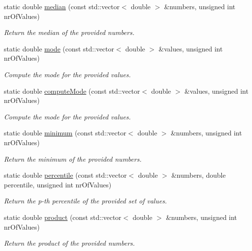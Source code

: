 \begin{DoxyCompactItemize}
static double \hyperlink{classmultiscale_1_1Numeric_a6aabc739f68b2c8f39d7aeab3935a340}{median} (const std\-::vector$<$ double $>$ \&numbers, unsigned int nr\-Of\-Values)
\begin{DoxyCompactList}\small\item\em Return the median of the provided numbers. \end{DoxyCompactList}\item 
static double \hyperlink{classmultiscale_1_1Numeric_abd90392bc165b82d9352e68cd4969373}{mode} (const std\-::vector$<$ double $>$ \&values, unsigned int nr\-Of\-Values)
\begin{DoxyCompactList}\small\item\em Compute the mode for the provided values. \end{DoxyCompactList}\item 
static double \hyperlink{classmultiscale_1_1Numeric_a8e8b37fd814847d7f15bdd9a7a6a7ae3}{compute\-Mode} (const std\-::vector$<$ double $>$ \&values, unsigned int nr\-Of\-Values)
\begin{DoxyCompactList}\small\item\em Compute the mode for the provided values. \end{DoxyCompactList}\item 
static double \hyperlink{classmultiscale_1_1Numeric_ac4c6e362613cb29641e1762b75489beb}{minimum} (const std\-::vector$<$ double $>$ \&numbers, unsigned int nr\-Of\-Values)
\begin{DoxyCompactList}\small\item\em Return the minimum of the provided numbers. \end{DoxyCompactList}\item 
static double \hyperlink{classmultiscale_1_1Numeric_a718a94c1f6ccfc038f2260a590e62ce4}{percentile} (const std\-::vector$<$ double $>$ \&numbers, double percentile, unsigned int nr\-Of\-Values)
\begin{DoxyCompactList}\small\item\em Return the p-\/th percentile of the provided set of values. \end{DoxyCompactList}\item 
static double \hyperlink{classmultiscale_1_1Numeric_a8e24dd3dea31a0180d7c01d6c019aba4}{product} (const std\-::vector$<$ double $>$ \&numbers, unsigned int nr\-Of\-Values)
\begin{DoxyCompactList}\small\item\em Return the product of the provided numbers. \end{DoxyCompactList}\item 

\end{DoxyCompactItemize}
